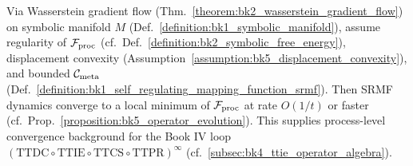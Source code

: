 \begin{theorem}
\label{theorem:bk5_operator_convergence}
Via Wasserstein gradient flow (Thm.~\ref{theorem:bk2_wasserstein_gradient_flow}) on symbolic manifold $M$ (Def.~\ref{definition:bk1_symbolic_manifold}), assume regularity of $\mathcal{F}_{\text{proc}}$ (cf.~Def.~\ref{definition:bk2_symbolic_free_energy}), displacement convexity (Assumption~\ref{assumption:bk5_displacement_convexity}), and bounded $\mathcal{C}_{\text{meta}}$ (Def.~\ref{definition:bk1_self_regulating_mapping_function_srmf}).
Then SRMF dynamics converge to a local minimum of $\mathcal{F}_{\text{proc}}$ at rate $O(1/t)$ or faster (cf.~Prop.~\ref{proposition:bk5_operator_evolution}). This supplies process-level convergence background for the Book IV loop $(\mathrm{TTDC}\circ\mathrm{TTIE}\circ\mathrm{TTCS}\circ\mathrm{TTPR})^{\infty}$ (cf.~\ref{subsec:bk4_ttie_operator_algebra}).
\end{theorem}

